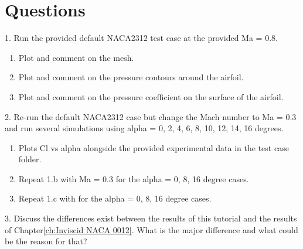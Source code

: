 \section{Questions}
1. Run the provided default NACA2312 test case at the provided Ma = 0.8.
\begin{enumerate}[label=(\alph*)]
    \item Plot and comment on the mesh.
    \item Plot and comment on the pressure contours around the airfoil.
    \item Plot and comment on the pressure coefficient on the surface of the airfoil.
\end{enumerate}
2. Re-run the default NACA2312 case but change the Mach number to Ma = 0.3 and run several simulations using alpha = 0, 2, 4, 6, 8, 10, 12, 14, 16 degrees.
\begin{enumerate}[label=(\alph*)]
    \item Plots Cl vs alpha alongside the provided experimental data\cite{ladson1988effects} in the test case folder.
    \item Repeat 1.b with Ma = 0.3 for the alpha = 0, 8, 16 degree cases.
    \item Repeat 1.c with for the alpha = 0, 8, 16 degree cases.
\end{enumerate}
3. Discuss the differences exist between the results of this tutorial and the results of Chapter\ref{ch:Inviscid NACA 0012}. What is the major difference and what could be the reason for that?

